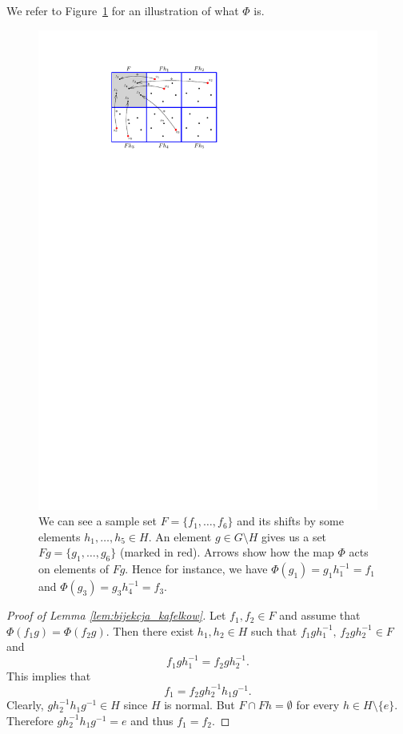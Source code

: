 \noindent
We refer to Figure~\ref{fig:bijekcja} for an illustration of what $\Phi$ is.
\begin{figure}
\centering
\includegraphics[scale=1.5]{Graphics/obrazek_bijekcja}
\caption{We can see a sample set $F=\{f_1,\ldots,f_6\}$ and its shifts by some elements $h_1,\ldots, h_5\in H$. An element $g\in G\setminus H$ gives us a set $Fg=\{g_1,\ldots,g_6\}$ (marked in red). Arrows show how the map $\Phi$ acts on elements of $Fg$. Hence for instance, we have  $\Phi(g_1) = g_1h_1^{-1} = f_1$ and $\Phi(g_3) = g_3h_4^{-1} = f_3$. 
}\label{fig:bijekcja}
\end{figure}

\begin{proof}[Proof of Lemma \ref{lem:bijekcja_kafelkow}]
Let $f_1,f_2\in F$ and assume that $\Phi(f_1g)=\Phi(f_2g).$
Then there exist $h_1, h_2\in H$ such that $f_1gh_1^{-1},\,f_2gh_2^{-1}\in F$ and 
\[
f_1gh_1^{-1}=f_2gh_2^{-1}.
\]
This implies that
\[
f_1=f_2gh_2^{-1}h_1g^{-1}.
\]
Clearly, $gh_2^{-1}h_1g^{-1}\in H$ since $H$ is normal. But $F\cap Fh=\emptyset$ for every $h\in H\setminus\{e\}$. Therefore $gh_2^{-1}h_1g^{-1}=e$ and thus $f_1=f_2$.
\end{proof}


